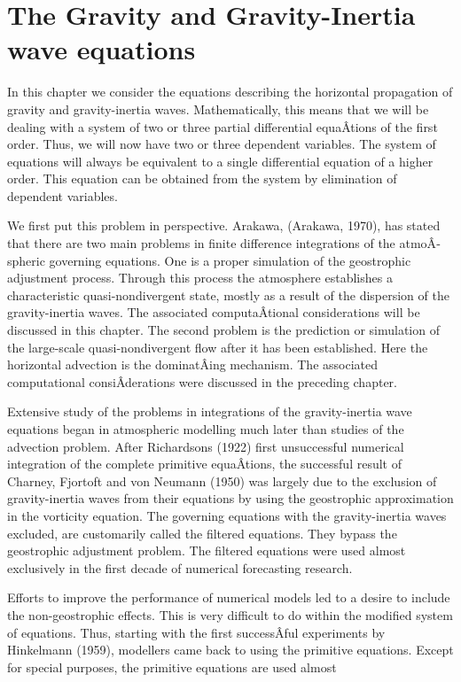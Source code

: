 \section{The Gravity and Gravity-Inertia wave equations}\label{Chapter4}

In this chapter we consider the equations describing the horizontal
propagation of gravity and gravity-inertia waves. Mathematically, this
means that we will be dealing with a system of two or three partial
differential equaÂ­tions of the first order. Thus, we will now have two
or three dependent variables. The system of equations will always be
equivalent to a single differential equation of a higher order. This
equation can be obtained from the system by elimination of dependent
variables.

We first put this problem in perspective. Arakawa, (Arakawa, 1970), has
stated that there are two main problems in finite difference
integrations of the atmoÂ­spheric governing equations. One is a proper
simulation of the geostrophic adjustment process. Through this process
the atmosphere establishes a characteristic quasi-nondivergent state,
mostly as a result of the dispersion of the gravity-inertia waves. The
associated computaÂ­tional considerations will be discussed in this
chapter. The second problem is the prediction or simulation of the
large-scale quasi-nondivergent flow after it has been established. Here
the horizontal advection is the dominatÂ­ing mechanism. The associated
computational consiÂ­derations were discussed in the preceding chapter.

Extensive study of the problems in integrations of the gravity-inertia
wave equations began in atmospheric modelling much later than studies of
the advection problem. After Richardson\textquotesingle s (1922) first
unsuccessful numerical integration of the complete primitive equaÂ­tions,
the successful result of Charney, Fjortoft and von Neumann (1950) was
largely due to the exclusion of gravity-inertia waves from their
equations by using the geostrophic approximation in the vorticity
equation. The governing equations with the gravity-inertia waves
excluded, are customarily called the filtered equations. They bypass the
geostrophic adjustment problem. The filtered equations were used almost
exclusively in the first decade of numerical forecasting research.

Efforts to improve the performance of numerical models led to a desire
to include the non-geostrophic effects. This is very difficult to do
within the modified system of equations. Thus, starting with the first
successÂ­ful experiments by Hinkelmann (1959), modellers came back to
using the primitive equations. Except for special purposes, the
primitive equations are used almost


